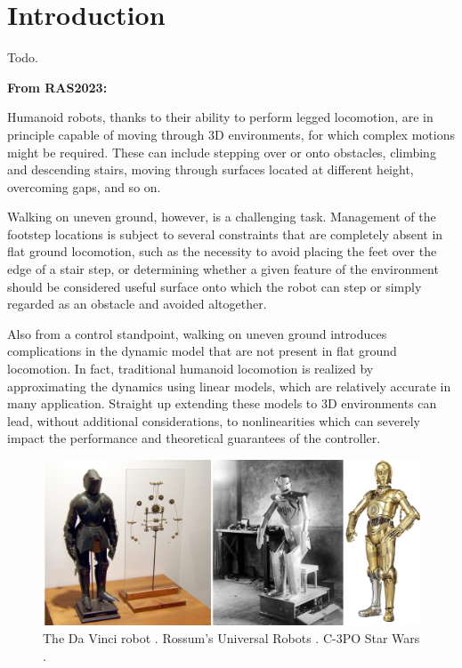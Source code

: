 \chapter{Introduction}
Todo.

\textbf{From RAS2023:}

Humanoid robots, thanks to their ability to perform legged locomotion,
are in principle capable of moving through 3D environments, for which complex
motions might be required. These can include stepping over or onto obstacles,
climbing and descending stairs, moving through surfaces located at different
height, overcoming gaps, and so on.

Walking on uneven ground, however, is a challenging task. Management of the
footstep locations is subject to several constraints that are completely absent
in flat ground locomotion, such as the necessity to avoid placing the feet over
the edge of a stair step, or determining whether a given feature of the
environment should be considered useful surface onto which the robot can
step or simply regarded as an obstacle and avoided altogether.

Also from a control standpoint, walking on uneven ground introduces
complications in the dynamic model that are not present in flat ground
locomotion. In fact, traditional humanoid locomotion is realized by
approximating the dynamics using linear models, which are relatively accurate
in many application. Straight up extending these models to 3D environments can
lead, without additional considerations, to nonlinearities which can severely
impact the performance and theoretical guarantees of the controller.

\begin{figure}
    \centering
    \includegraphics[width=\textwidth]{figures/01-introduction/robot-history.jpg}
    \caption{The Da Vinci robot \cite{Moran2006TheDaVinciRobot}.
        Rossum's Universal Robots \cite{Capek1920RUR}.
        C-3PO Star Wars \cite{StarWars1977}.
    }
    \label{fig:introduction:robots-in-history}
\end{figure}


